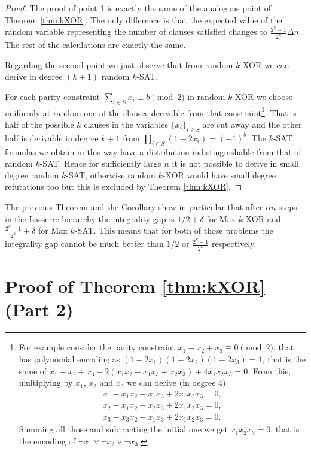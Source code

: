 \documentclass[a4paper,twoside,justified]{tufte-handout}
\begin{document}
\begin{proof}
The proof of point 1 is exactly the same of the analogous point of Theorem \ref{thm:kXOR}. 
The only difference is that the expected value of the random variable representing the number of clauses satisfied changes to $\frac{2^k-1}{2^k}\Delta n$. 
The rest of the calculations are exactly the same.

Regarding the second point we just observe that from random $k$-XOR we can derive in degree $(k+1)$ random $k$-SAT.

For each parity constraint $\sum_{i\in S}x_i\equiv b \pmod{2}$ in random $k$-XOR we choose uniformly at random one of the clauses derivable from that constraint\footnote{
For example consider the parity constraint $x_1+x_2+x_3\equiv 0 \pmod{2}$, that has polynomial encoding as $(1-2x_1)(1-2x_2)(1-2x_3)=1$, that is the same of 
$x_1+x_2+x_3-2(x_1x_2+x_1x_3+x_2x_3)+4x_1x_2x_3=0$. 
From this, multiplying by $x_1$, $x_2$ and $x_3$ we can derive (in degree 4)
\begin{equation*}
\begin{split}
x_1-x_1x_2-x_1x_3 +2x_1x_2x_3=0,\\
x_2 -x_1x_2-x_2x_3+2x_1x_2x_3=0,\\
x_3 -x_3x_2-x_1x_3+2x_1x_2x_3=0.
\end{split}
\end{equation*}
Summing all those and subtracting the initial one we get $x_1x_2x_3=0$, that is the encoding of $\neg x_1\vee \neg x_2 \vee \neg x_3$.
}.
That is half of the possible $k$ clauses in the variables $\{x_i\}_{i\in S}$ are cut away and the other half is derivable in degree $k+1$ from $\prod_{i\in S}(1-2x_i)=(-1)^b$. 
The $k$-SAT formulas we obtain in this way have a distribution indistinguishable from that of random $k$-SAT. Hence for sufficiently large $n$ it is not possible to derive in small degree random $k$-SAT, otherwise random $k$-XOR would have small degree refutations too but this is excluded by Theorem \ref{thm:kXOR}.
\end{proof}

The previous Theorem and the Corollary show in particular that after $\alpha n$ steps in the Lasserre hierarchy the integrality gap 
is $1/2 +\delta$ for Max $k$-XOR and $\frac{2^k-1}{2^k}+\delta$ for Max $k$-SAT. 
This means that for both of those problems the integrality gap cannot be much better than $1/2$ or $\frac{2^k-1}{2^k}$ respectively.

\section{Proof of Theorem \ref{thm:kXOR} (Part 2)}
\end{document}
